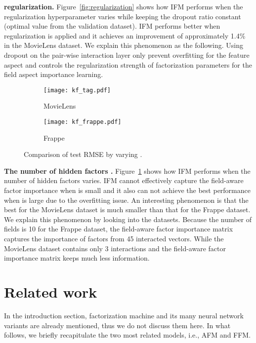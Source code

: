 \documentclass[letterpaper]{article} \usepackage{aaai19}  \usepackage{times}  \usepackage{helvet}  \usepackage{courier}  \usepackage{url}  \usepackage{graphicx}  \frenchspacing  \setlength{\pdfpagewidth}{8.5in}  \setlength{\pdfpageheight}{11in}  \usepackage{mathtools}
\begin{document}
\textbf{ regularization.} Figure~\ref{fig:regularization} shows how IFM performs when the  regularization hyperparameter  varies while keeping the dropout ratio constant (optimal value from the validation dataset). IFM performs better when  regularization is applied and it achieves an improvement of approximately 1.4\% in the MovieLens dataset. We explain this phenomenon as the following. Using dropout on the pair-wise interaction layer only prevent overfitting for the feature aspect and  controls the regularization strength of factorization parameters for the field aspect importance learning. 



\begin{figure}[t!]
\begin{center} 
\begin{subfigure}[MovieLens]{0.47\columnwidth}
{
\texttt{[image: kf\_tag.pdf]}
\caption{MovieLens}
}
\end{subfigure}  
\begin{subfigure}[Frappe]{0.47\columnwidth}
{
\texttt{[image: kf\_frappe.pdf]}
\caption{Frappe}
} 
\end{subfigure} 
\caption{Comparison of test RMSE by varying .} 
\label{fig:kf_hidden} 
\end{center}
\end{figure} 


\textbf{The number of hidden factors .} Figure~\ref{fig:kf_hidden} shows how IFM performs when the number of hidden factors  varies. IFM cannot effectively capture the field-aware factor importance when  is small and it also can not achieve the best performance when  is large due to the overfitting issue. An interesting phenomenon is that the best  for the MovieLens dataset is much smaller than that for the Frappe dataset. We explain this phenomenon by looking into the datasets. Because the number of fields  is 10 for the Frappe dataset, the field-aware factor importance matrix captures the importance of factors from 45 interacted vectors. While the MovieLens dataset contains only 3 interactions and the field-aware factor importance matrix keeps much less information. 


\section{Related work} \label{sec:related}
In the introduction section, factorization machine and its many neural network variants are already mentioned, thus we do not discuss them here. In what follows, we briefly recapitulate the two most related models, i.e., AFM\cite{xiaoattentional} and FFM\cite{juan2016field}.
\end{document}
